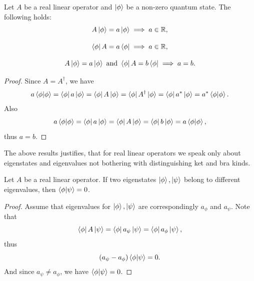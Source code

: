 \documentclass[main.tex]{subfiles}
\begin{document}
\begin{proposition}
Let $A$ be a real linear operator and $\ket{\phi}$ be a non-zero quantum state. The following holds:
\begin{equation}
A\ket{\phi} = a\ket{\phi} \implies a\in\mathbb{R},
\end{equation}

\begin{equation}
\bra{\phi} A = a\bra{\phi} \implies a\in\mathbb{R},
\end{equation}

\begin{equation}
A\ket{\phi} = a\ket{\phi} \text{ and } \bra{\phi} A = b\bra{\phi} \implies a = b.
\end{equation}

\end{proposition}
\begin{proof}
Since $A = A^\dagger$, we have
\begin{equation}
a\bra{\phi}\ket{\phi} = \bra{\phi} a \ket{\phi} = \bra{\phi} A \ket{\phi} = \bra{\phi} A^\dagger \ket{\phi} = \bra{\phi} a^* \ket{\phi} = a^* \bra{\phi}\ket{\phi}.
\end{equation}
Also
\begin{equation}
a\bra{\phi}\ket{\phi} = \bra{\phi} a \ket{\phi} = \bra{\phi} A \ket{\phi} = \bra{\phi} b \ket{\phi} = a\bra{\phi}\ket{\phi},
\end{equation}
thus $a = b$.
\end{proof}

The above results justifies, that for real linear operators we speak only about eigenstates and eigenvalues not bothering with distinguishing ket and bra kinds.

\begin{proposition}
\label{orthogonal-fact}
Let $A$ be a real linear operator. If two eigenstates $\ket{\phi}, \ket{\psi}$ belong to different eigenvalues, then $\bra{\phi}\ket{\psi} = 0$.
\end{proposition}
\begin{proof}
Assume that eigenvalues for $\ket{\phi}, \ket{\psi}$ are correspondingly $a_\phi$ and $a_\psi$. Note that
\begin{equation}
\bra{\phi}A\ket{\psi} = \bra{\phi}a_\psi\ket{\psi} = \bra{\phi}a_\phi\ket{\psi},
\end{equation}
thus
\begin{equation}
(a_\psi - a_\phi) \bra{\phi}\ket{\psi} = 0.
\end{equation}
And since $a_\psi \not= a_\phi$, we have $\bra{\phi}\ket{\psi} = 0$.
\end{proof} 
\end{document}
